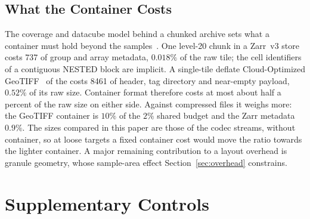 \subsection{What the Container Costs}
\label{app:container}
The coverage and datacube model behind a chunked archive sets what a
container must hold beyond the samples~\cite{baumann2025datacube}. One
level-20 chunk in a Zarr~v3 store~\cite{moore2023zarr} costs
\SI{737}{\byte} of group and array metadata, $0.018\%$ of the raw tile;
the cell identifiers of a contiguous NESTED block are implicit. A
single-tile deflate Cloud-Optimized GeoTIFF~\cite{ogc_cog2023} of the
 costs \SI{8461}{\byte} of header, tag directory and
near-empty payload, $0.52\%$ of its raw size. Container format therefore
costs at most about half a percent of the raw size on either side.
Against compressed files it weighs more: the GeoTIFF container is
$10\%$ of the $2\%$ shared budget and the Zarr metadata $0.9\%$.
The sizes compared in this paper are those of the codec streams, without
container, so at loose targets a fixed container cost would move
the ratio towards the lighter container. A major remaining
contribution to a layout overhead is granule geometry, whose sample-area
effect Section~\ref{sec:overhead} constrains.

\section{Supplementary Controls}
\label{app:controls}

